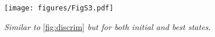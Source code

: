 \begin{figure}[H]
    \centering
    \texttt{[image: figures/FigS3.pdf]}
    \caption{
        \textit{Similar to} \autoref{fig:discrim}
        \textit{but for both initial and best states}.
    }
    \label{supp:discrim-dist-full}
\end{figure}

